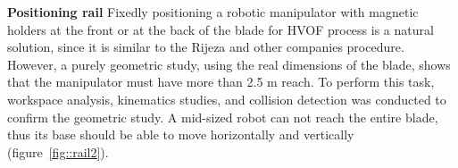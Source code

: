 

\textbf{Positioning rail}
Fixedly positioning a robotic manipulator with magnetic holders at the front or
at the back of the blade for HVOF process is a natural solution, since it is
similar to the Rijeza and other companies procedure. However, a purely geometric
study, using the real dimensions of the blade, shows that the manipulator must
have more than 2.5 m reach. To perform this task, workspace analysis, kinematics
studies, and collision detection was conducted to confirm the geometric study. A mid-sized
robot can not reach the entire blade, thus its base should be able to move
horizontally and vertically (figure~\ref{fig::rail2}).

